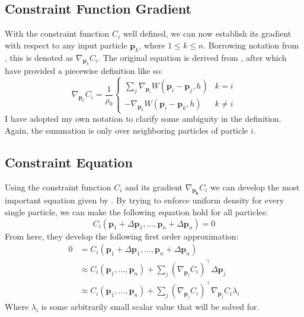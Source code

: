 \documentclass[sigplan,screen]{acmart}
\begin{document}
\subsection{Constraint Function Gradient}
With the constraint function $C_i$ well defined, we can now establish its gradient with respect to any input particle $\textbf{p}_k$, where $1 \leq k \leq n$. Borrowing notation from \cite{Muller}, this is denoted as $\nabla_{\mathbf{p}_k} C_i$. The original equation is derived from \cite{Monaghan1992}, after which \cite{Muller} have provided a piecewise definition like so:
\begin{equation}
  \nabla_{\mathbf{p}_k} C_i = \frac{1}{\rho_0} \begin{cases}
    \sum_j \nabla_{\mathbf{p}_i} W(\mathbf{p}_i - \mathbf{p}_j, h) & k = i\\
    -\nabla_{\mathbf{p}_k} W(\mathbf{p}_i - \mathbf{p}_k, h) & k \neq i
  \end{cases}
\end{equation}
I have adopted  my own notation to clarify some ambiguity in the definition. Again, the summation is only over neighboring particles of particle $i$.

\subsection{Constraint Equation}
Using the constraint function $C_i$ and its gradient $\nabla_{\mathbf{p_k}} C_i$ we can develop the most important equation given by \cite{Muller}. By trying to enforce uniform density for every single particle, we can make the following equation hold for all particles:
\begin{equation}
  C_i(\mathbf{p}_1 + \Delta \mathbf{p}_1, ...,\mathbf{p}_n + \Delta \mathbf{p}_n) = 0
\end{equation}
\label{constraint_eq}
From here, they develop the following first order approximation:
\begin{align}
  0 &= C_i(\mathbf{p}_1 + \Delta \mathbf{p}_1, ...,\mathbf{p}_n + \Delta \mathbf{p}_n)\\
  &\approx C_i(\mathbf{p}_1, ...,\mathbf{p}_n) + \sum_j (\nabla_{\mathbf{p}_j} C_i)^\top \Delta \mathbf{p}_j\\
  &\approx C_i(\mathbf{p}_1, ...,\mathbf{p}_n) + \sum_j (\nabla_{\mathbf{p}_j} C_i)^\top \nabla_{\mathbf{p}_j} C_i \lambda_i
\end{align}
Where $\lambda_i$ is some arbitrarily small scalar value that will be solved for.
\label{constraint_approx}
\end{document}
